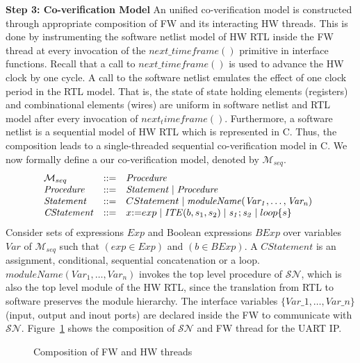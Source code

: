 \documentclass[sigconf]{acmart}
\begin{document}
\textbf{Step 3: Co-verification Model}
%
An unified co-verification model is constructed through appropriate composition of 
FW and its interacting HW threads.  This is done by instrumenting the 
software netlist model of HW RTL inside the FW thread at every invocation 
of the $next\_timeframe()$ primitive in interface functions.  Recall that a
call to $next\_timeframe()$ is used to advance the HW clock by one cycle.  A call
to the software netlist emulates the effect of one clock period in the RTL 
model. That is, the state of state holding elements (registers) and combinational 
elements (wires) are uniform in software netlist and RTL model after every invocation of 
$next_timeframe()$.  Furthermore, a software
netlist is a sequential model of HW RTL which is represented in C.  Thus, the
composition leads to a single-threaded sequential co-verification model in C.  
%
We now formally define a our co-verification model, denoted by 
$\mathcal{M}_{seq}$.
%
\[ 
\begin{array}[t]{@{}lll}
  \mathcal{M}_{seq} & {:}{:}{=} & \mathit{Procedure} \\
\mathit{Procedure} & {:}{:}{=} & \mathit{Statement} \mid \mathit{Procedure} \\
\mathit{Statement} & {:}{:}{=} & CStatement \mid \mathit{moduleName(Var_1,\dots,Var_n)} \\
\mathit{CStatement} & {:}{:}{=} & x {:}{=} exp \mid \mathit{ITE}(b, s_1,s_2) \mid \mathit{s_1;s_2} \mid loop\{s\} \\ 
\end{array}
\]
%
Consider sets of expressions $Exp$ and Boolean expressions $BExp$ 
over variables $Var$ of $\mathcal{M}_{seq}$ such that $(exp \in Exp)$ and 
$(b \in BExp)$. A $\mathit{CStatement}$ is an assignment,
conditional, sequential concatenation or a loop.
$\mathit{moduleName(Var_1,\dots,Var_n)}$ invokes the top level 
procedure of $\mathcal{SN}$, which is also the top level 
module of the HW RTL, since the translation from RTL to software preserves
the module hierarchy.  The interface variables $\{Var\_1,\dots,Var\_n\}$ 
(input, output and inout ports) are declared inside the 
FW to communicate with $\mathcal{SN}$.  Figure~\ref{compose} shows the 
composition of $\mathcal{SN}$ and FW thread for the UART IP.
%
\begin{figure}[t]
  \caption{Composition of FW and HW threads}
\label{compose}
\end{figure}
\end{document}
